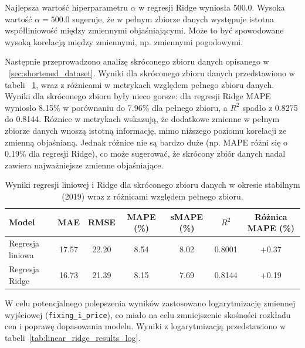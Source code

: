 Najlepsza wartość hiperparametru \(\alpha\) w regresji Ridge wyniosła 500.0. Wysoka wartość \(\alpha = 500.0\) sugeruje, że w pełnym zbiorze danych występuje istotna współliniowość między zmiennymi objaśniającymi. Może to być spowodowane wysoką korelacją między zmiennymi, np. zmiennymi pogodowymi.

Następnie przeprowadzono analizę skróconego zbioru danych opisanego w ~\ref{sec:shortened_dataset}. Wyniki dla skróconego zbioru danych przedstawiono w tabeli ~\ref{tab:linear_ridge_results_short}, wraz z różnicami w metrykach względem pełnego zbioru danych. Wyniki dla skróconego zbioru były nieco gorsze: dla regresji Ridge MAPE wyniosło 8.15\% w porównaniu do 7.96\% dla pełnego zbioru, a \(R^2\) spadło z 0.8275 do 0.8144. Różnice w metrykach wskazują, że dodatkowe zmienne w pełnym zbiorze danych wnoszą istotną informację, mimo niższego poziomu korelacji ze zmienną objaśnianą. Jednak różnice nie są bardzo duże (np. MAPE różni się o 0.19\% dla regresji Ridge), co może sugerować, że skrócony zbiór danych nadal zawiera najważniejsze zmienne objaśniające.

\begin{table}[h]
    \centering
    \caption{Wyniki regresji liniowej i Ridge dla skróconego zbioru danych w okresie stabilnym (2019) wraz z różnicami względem pełnego zbioru.}
    \label{tab:linear_ridge_results_short}
    \begin{tabular}{|l|ccccc|c|}
        \hline
        \textbf{Model} & \textbf{MAE} & \textbf{RMSE} & \textbf{MAPE (\%)} & \textbf{sMAPE (\%)} & \textbf{\(R^2\)} & \textbf{Różnica MAPE (\%)} \\
        \hline
        Regresja liniowa & 17.57 & 22.20 & 8.54 & 8.02 & 0.8001 & +0.37 \\
        Regresja Ridge   & 16.73 & 21.39 & 8.15 & 7.69 & 0.8144 & +0.19 \\
        \hline
    \end{tabular}
\end{table}

W celu potencjalnego polepszenia wyników zastosowano logarytmizację zmiennej wyjściowej (\texttt{fixing\_i\_price}), co miało na celu zmniejszenie skośności rozkładu cen i poprawę dopasowania modelu. Wyniki z logarytmizacją przedstawiono w tabeli~\ref{tab:linear_ridge_results_log}.

